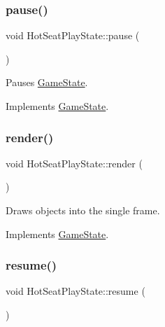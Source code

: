 \subsubsection{\texorpdfstring{pause()}{pause()}}
{\footnotesize\ttfamily void Hot\+Seat\+Play\+State\+::pause (\begin{DoxyParamCaption}{ }\end{DoxyParamCaption})\hspace{0.3cm}{\ttfamily [virtual]}}



Pauses \mbox{\hyperlink{class_game_state}{Game\+State}}. 



Implements \mbox{\hyperlink{class_game_state_aafc908582760099891b37bb380ddd87a}{Game\+State}}.

\mbox{\label{class_hot_seat_play_state_a66bbc19d0a2046a3ff2d926669d0ae26}} 
\subsubsection{\texorpdfstring{render()}{render()}}
{\footnotesize\ttfamily void Hot\+Seat\+Play\+State\+::render (\begin{DoxyParamCaption}\item[{\mbox{\hyperlink{class_game_engine}{Game\+Engine}} $\ast$}]{ }\end{DoxyParamCaption})\hspace{0.3cm}{\ttfamily [virtual]}}



Draws objects into the single frame. 



Implements \mbox{\hyperlink{class_game_state_a0d56cd5355f59a87cf95e1c6d719f329}{Game\+State}}.

\mbox{\label{class_hot_seat_play_state_a7acf9709fdb1527a321730c49783cb50}} 
\subsubsection{\texorpdfstring{resume()}{resume()}}
{\footnotesize\ttfamily void Hot\+Seat\+Play\+State\+::resume (\begin{DoxyParamCaption}{ }\end{DoxyParamCaption})\hspace{0.3cm}{\ttfamily [virtual]}}



